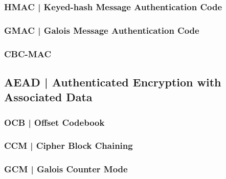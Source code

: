 \subsubsection{HMAC | Keyed-hash Message Authentication Code}


\textsf{\small }

\subsubsection{GMAC | Galois Message Authentication Code}


\textsf{\small }

\subsubsection{CBC-MAC}


\textsf{\small }


\subsection{AEAD | Authenticated Encryption with Associated Data}


\textsf{\small }

\subsubsection{OCB | Offset Codebook} %


\textsf{\small }

\subsubsection{CCM | Cipher Block Chaining}


\textsf{\small }

\subsubsection{GCM | Galois Counter Mode}


\textsf{\small }

